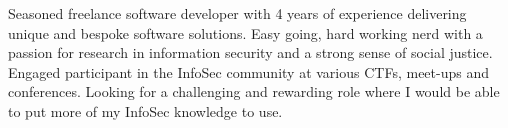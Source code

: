 

\begin{cvparagraph}

Seasoned freelance software developer with 4 years of experience delivering unique and bespoke software solutions. Easy going, hard working nerd with a passion for research in information security and a strong sense of social justice. Engaged participant in the InfoSec community at various CTFs, meet-ups and conferences. Looking for a challenging and rewarding role where I would be able to put more of my InfoSec knowledge to use.

\end{cvparagraph}
